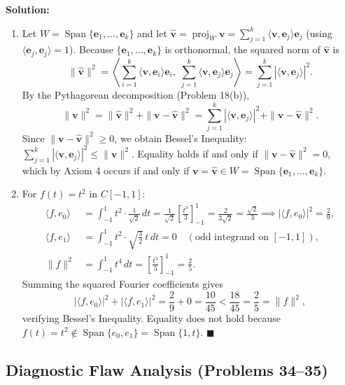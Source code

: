 \documentclass[11pt, letterpaper]{article}
\theoremstyle{definition}
\theoremstyle{remark}
\begin{document}
\textbf{Solution:}
\begin{enumerate}[label=(\alph*)]
    \item Let $W = \operatorname{Span}\{\mathbf{e}_1, \dots, \mathbf{e}_k\}$ and let $\hat{\mathbf{v}} = \operatorname{proj}_W \mathbf{v} = \sum_{j=1}^k \langle \mathbf{v}, \mathbf{e}_j \rangle \mathbf{e}_j$ (using $\langle \mathbf{e}_j, \mathbf{e}_j \rangle = 1$). Because $\{\mathbf{e}_1, \dots, \mathbf{e}_k\}$ is orthonormal, the squared norm of $\hat{\mathbf{v}}$ is
    \[
    \|\hat{\mathbf{v}}\|^2 = \left\langle \sum_{i=1}^k \langle \mathbf{v}, \mathbf{e}_i \rangle \mathbf{e}_i, \; \sum_{j=1}^k \langle \mathbf{v}, \mathbf{e}_j \rangle \mathbf{e}_j \right\rangle = \sum_{j=1}^k |\langle \mathbf{v}, \mathbf{e}_j \rangle|^2.
    \]
    By the Pythagorean decomposition (Problem 18(b)),
    \[
    \|\mathbf{v}\|^2 = \|\hat{\mathbf{v}}\|^2 + \|\mathbf{v} - \hat{\mathbf{v}}\|^2 = \sum_{j=1}^k |\langle \mathbf{v}, \mathbf{e}_j \rangle|^2 + \|\mathbf{v} - \hat{\mathbf{v}}\|^2.
    \]
    Since $\|\mathbf{v} - \hat{\mathbf{v}}\|^2 \ge 0$, we obtain Bessel's Inequality: $\sum_{j=1}^k |\langle \mathbf{v}, \mathbf{e}_j \rangle|^2 \le \|\mathbf{v}\|^2$. Equality holds if and only if $\|\mathbf{v} - \hat{\mathbf{v}}\|^2 = 0$, which by Axiom 4 occurs if and only if $\mathbf{v} = \hat{\mathbf{v}} \in W = \operatorname{Span}\{\mathbf{e}_1, \dots, \mathbf{e}_k\}$.
    \item For $f(t) = t^2$ in $C[-1, 1]$:
    \begin{align*}
    \langle f, e_0 \rangle &= \int_{-1}^1 t^2 \cdot \frac{1}{\sqrt{2}}\,dt = \frac{1}{\sqrt{2}}\left[\frac{t^3}{3}\right]_{-1}^1 = \frac{2}{3\sqrt{2}} = \frac{\sqrt{2}}{3} \implies |\langle f, e_0 \rangle|^2 = \frac{2}{9}, \\
    \langle f, e_1 \rangle &= \int_{-1}^1 t^2 \cdot \sqrt{\frac{3}{2}}\,t\,dt = 0 \quad (\text{odd integrand on } [-1, 1]), \\
    \|f\|^2 &= \int_{-1}^1 t^4\,dt = \left[\frac{t^5}{5}\right]_{-1}^1 = \frac{2}{5}.
    \end{align*}
    Summing the squared Fourier coefficients gives
    \[
    |\langle f, e_0 \rangle|^2 + |\langle f, e_1 \rangle|^2 = \frac{2}{9} + 0 = \frac{10}{45} < \frac{18}{45} = \frac{2}{5} = \|f\|^2,
    \]
    verifying Bessel's Inequality. Equality does not hold because $f(t) = t^2 \notin \operatorname{Span}\{e_0, e_1\} = \operatorname{Span}\{1, t\}$. $\blacksquare$
\end{enumerate}

\subsection{Diagnostic Flaw Analysis (Problems 34--35)}
\end{document}
